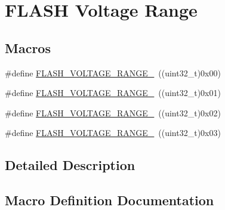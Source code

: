 \hypertarget{group___f_l_a_s_h_ex___voltage___range}{}\section{F\+L\+A\+SH Voltage Range}
\label{group___f_l_a_s_h_ex___voltage___range}
\subsection*{Macros}
\begin{DoxyCompactItemize}
\item 
\#define \hyperlink{group___f_l_a_s_h_ex___voltage___range_ga5cadf49a63c968cde3b980e5139d398e}{F\+L\+A\+S\+H\+\_\+\+V\+O\+L\+T\+A\+G\+E\+\_\+\+R\+A\+N\+G\+E\+\_}~((uint32\+\_\+t)0x00)
\item 
\#define \hyperlink{group___f_l_a_s_h_ex___voltage___range_gad047be2bc7aa9be946b5b0c6b3062ef3}{F\+L\+A\+S\+H\+\_\+\+V\+O\+L\+T\+A\+G\+E\+\_\+\+R\+A\+N\+G\+E\+\_}~((uint32\+\_\+t)0x01)
\item 
\#define \hyperlink{group___f_l_a_s_h_ex___voltage___range_ga50950407a789684eec9216f49e0831a0}{F\+L\+A\+S\+H\+\_\+\+V\+O\+L\+T\+A\+G\+E\+\_\+\+R\+A\+N\+G\+E\+\_}~((uint32\+\_\+t)0x02)
\item 
\#define \hyperlink{group___f_l_a_s_h_ex___voltage___range_gabf8037a482f18815c5a67f287223a658}{F\+L\+A\+S\+H\+\_\+\+V\+O\+L\+T\+A\+G\+E\+\_\+\+R\+A\+N\+G\+E\+\_}~((uint32\+\_\+t)0x03)
\end{DoxyCompactItemize}


\subsection{Detailed Description}


\subsection{Macro Definition Documentation}
